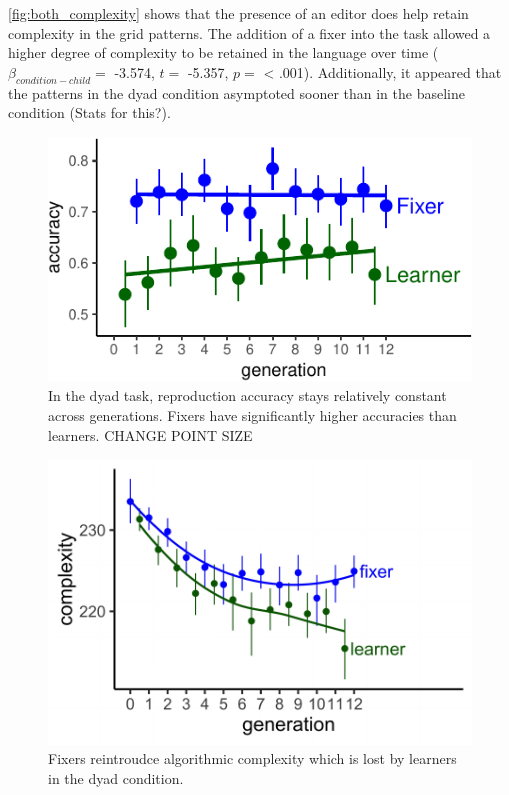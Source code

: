 \documentclass[10pt, letterpaper]{article}
\newenvironment{CodeChunk}{}{}
\begin{document}
\ref{fig:both_complexity} shows that the presence of an editor does help
retain complexity in the grid patterns. The addition of a fixer into the
task allowed a higher degree of complexity to be retained in the
language over time (\(\beta_{condition-child} =\) -3.574, \(t =\)
-5.357, \(p =\) \textless{} .001). Additionally, it appeared that the
patterns in the dyad condition asymptoted sooner than in the baseline
condition (Stats for this?).

\begin{CodeChunk}
\begin{figure}[tb]

{\centering \includegraphics{figs/dyad_accuracy-1} 

}

\caption[In the dyad task, reproduction accuracy stays relatively constant across generations]{In the dyad task, reproduction accuracy stays relatively constant across generations. Fixers have significantly higher accuracies than learners. CHANGE POINT SIZE}\label{fig:dyad_accuracy}
\end{figure}
\end{CodeChunk}

\begin{CodeChunk}
\begin{figure}[tb]

{\centering \includegraphics{figs/dyad_complexity-1} 

}

\caption[Fixers reintroudce algorithmic complexity which is lost by learners in the dyad condition]{Fixers reintroudce algorithmic complexity which is lost by learners in the dyad condition.}\label{fig:dyad_complexity}
\end{figure}
\end{CodeChunk}
\end{document}
